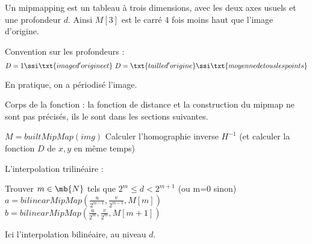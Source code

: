 
Un mipmapping est un tableau à trois dimensions, avec les deux axes usuels et une profondeur $d$.
Ainsi $M[3]$ est le carré $4$ fois moins haut que l'image d'origine. 

Convention sur les profondeurs : $$D = 1 \ssi \txt{image d'origine et} \ D = \txt{taille d'origine} \ssi \txt{moyenne de tous les points}$$


En pratique, on a périodisé l'image.


Corps de la fonction : la fonction de distance et la construction du mipmap ne sont pas précisés, ils le sont dans les sections suivantes.
\medbreak
\medbreak
\begin{algorithm}[H]
\caption{$mainFunction(img,H,I)$}
$M=builtMipMap(img)$ \;%
Calculer l'homographie inverse $H^{-1}$ (et calculer la fonction $D$ de $x,y$ en même temps)\;
\end{algorithm}

\medbreak
\medbreak
L'interpolation trilinéaire :
\medbreak
\medbreak

\begin{algorithm}[H]
\caption{$evalPixel(u,v,d,M)$}
Trouver $m \in \mb{N}$ tels que $2^m \leq d < 2^{m+1}$ (ou m=0 sinon)\;
$a=bilinearMipMap(\frac{u}{2^{m-1}}, \frac{v}{2^{m-1}},M[m])$\;
$b= bilinearMipMap(\frac{u}{2^{m}}, \frac{v}{2^{m}},M[m+1])$\; 
\end{algorithm}

\medbreak
\medbreak
Ici l'interpolation bilinéaire, au niveau $d$.
\medbreak
\medbreak

